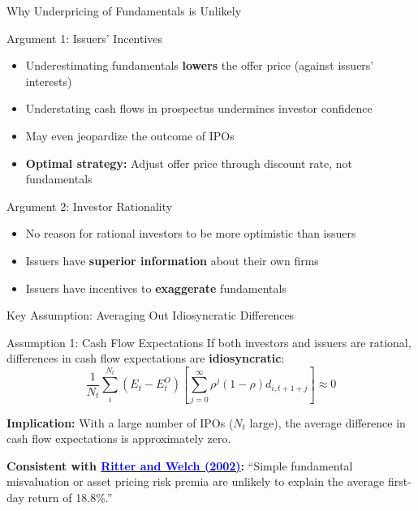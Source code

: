 \documentclass{beamer}
\begin{document}
\begin{frame}{Why Underpricing of Fundamentals is Unlikely}
\begin{alertblock}{Argument 1: Issuers' Incentives}
\begin{itemize}
    \item Underestimating fundamentals \textbf{lowers} the offer price (against issuers' interests)
    \item Understating cash flows in prospectus undermines investor confidence
    \item May even jeopardize the outcome of IPOs
    \item \textbf{Optimal strategy:} Adjust offer price through discount rate, not fundamentals
\end{itemize}
\end{alertblock}

\begin{alertblock}{Argument 2: Investor Rationality}
\begin{itemize}
    \item No reason for rational investors to be more optimistic than issuers
    \item Issuers have \textbf{superior information} about their own firms
    \item Issuers have incentives to \textbf{exaggerate} fundamentals
\end{itemize}
\end{alertblock}
\end{frame}

\begin{frame}{Key Assumption: Averaging Out Idiosyncratic Differences}
\begin{block}{Assumption 1: Cash Flow Expectations}
If both investors and issuers are rational, differences in cash flow expectations are \textbf{idiosyncratic}:
\[
\frac{1}{N_t}\sum_{i}^{N_t}\left(E_t - E_t^O\right)\left[\sum_{j=0}^{\infty}\rho^j(1-\rho)d_{i,t+1+j}\right] \approx 0
\]
\end{block}

\textbf{Implication:} With a large number of IPOs ($N_t$ large), the average difference in cash flow expectations is approximately zero.

\textbf{Consistent with \href{https://onlinelibrary.wiley.com/doi/10.1111/1540-6261.00478}{\textcolor{blue}{Ritter and Welch (2002)}}:} ``Simple fundamental misvaluation or asset pricing risk premia are unlikely to explain the average first-day return of 18.8\%.''
\end{frame}
\end{document}
